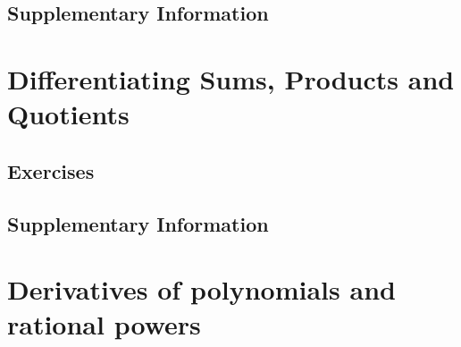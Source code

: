 \documentclass{fts_m2}
\begin{document}
    \subsection*{Supplementary Information}
    

    \section{Differentiating Sums, Products and Quotients}
    
    \subsection*{Exercises}
    
    \subsection*{Supplementary Information}
    

    \section{Derivatives of polynomials and rational powers}
    
\end{document}

